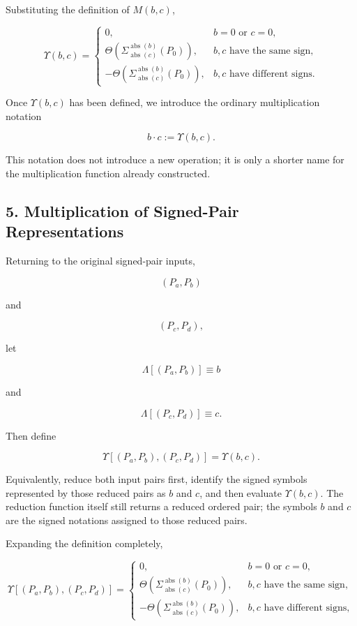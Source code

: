\documentclass[12pt]{article}
\begin{document}
Substituting the definition of \(M(b,c)\),

\[
\boxed{
\Upsilon(b,c)
=
\begin{cases}
0,
&
b=0\text{ or }c=0,
\\[8pt]
\Theta\left(
\Sigma^{\operatorname{abs}(b)}_{\operatorname{abs}(c)}
(P_0)
\right),
&
b,c\text{ have the same sign},
\\[10pt]
-
\Theta\left(
\Sigma^{\operatorname{abs}(b)}_{\operatorname{abs}(c)}
(P_0)
\right),
&
b,c\text{ have different signs}.
\end{cases}
}
\]

Once \(\Upsilon(b,c)\) has been defined, we introduce the ordinary multiplication notation

\[
\boxed{
b\cdot c:=\Upsilon(b,c).
}
\]

This notation does not introduce a new operation; it is only a shorter name for the multiplication function already constructed.

\subsection*{5. Multiplication of Signed-Pair Representations}

Returning to the original signed-pair inputs,

\[
(P_a,P_b)
\]

and

\[
(P_c,P_d),
\]

let

\[
\Lambda[(P_a,P_b)]\equiv b
\]

and

\[
\Lambda[(P_c,P_d)]\equiv c.
\]

Then define

\[
\boxed{
\Upsilon
\left[
(P_a,P_b),(P_c,P_d)
\right]
=
\Upsilon(b,c).
}
\]

Equivalently, reduce both input pairs first, identify the signed symbols represented by those reduced pairs as \(b\) and \(c\), and then evaluate \(\Upsilon(b,c)\). The reduction function itself still returns a reduced ordered pair; the symbols \(b\) and \(c\) are the signed notations assigned to those reduced pairs.

Expanding the definition completely,

\[
\boxed{
\Upsilon
\left[
(P_a,P_b),(P_c,P_d)
\right]
=
\begin{cases}
0,
&
b=0\text{ or }c=0,
\\[8pt]
\Theta\left(
\Sigma^{\operatorname{abs}(b)}_{\operatorname{abs}(c)}
(P_0)
\right),
&
b,c\text{ have the same sign},
\\[10pt]
-
\Theta\left(
\Sigma^{\operatorname{abs}(b)}_{\operatorname{abs}(c)}
(P_0)
\right),
&
b,c\text{ have different signs},
\end{cases}
}
\]
\end{document}
